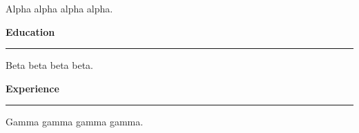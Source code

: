\documentclass[11pt]{article}
\newcommand{\cvsection}[1]{{\large\bfseries #1}\\[-6pt]\rule{\textwidth}{0.6pt}\vspace{2pt}}
\begin{document}
Alpha alpha alpha alpha.

\cvsection{Education}

Beta beta beta beta.

\cvsection{Experience}

Gamma gamma gamma gamma.
\end{document}
